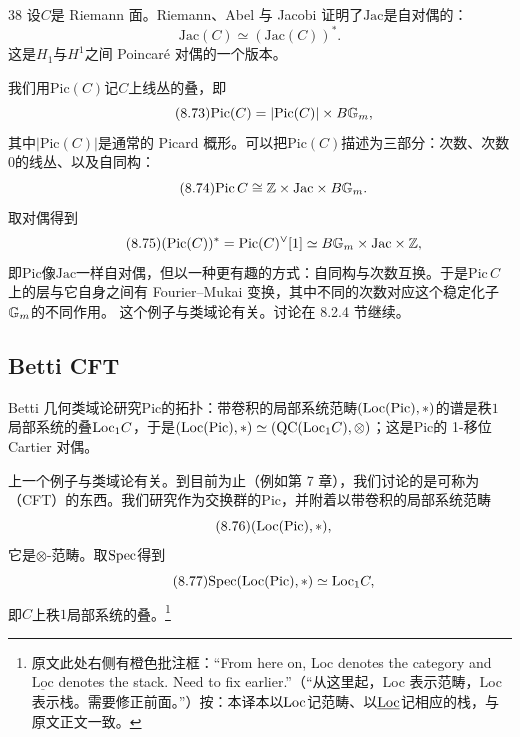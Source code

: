 \begin{srcex}{38}
设$C$是 Riemann 面。Riemann、Abel 与 Jacobi 证明了$\mathrm{Jac}$是自对偶的：
\begin{equation}\tag{8.72}
\mathrm{Jac}(C)\simeq(\mathrm{Jac}(C))^{*}.
\end{equation}
这是$H_1$与$H^1$之间 Poincar\'e 对偶的一个版本。

我们用$\mathrm{Pic}(C)$记$C$上线丛的叠，即
\begin{equation}\tag{8.73}
\mathrm{Pic}(C)=|\mathrm{Pic}(C)|\times B\mathbb{G}_m,
\end{equation}
其中$|\mathrm{Pic}(C)|$是通常的 Picard 概形。可以把$\mathrm{Pic}(C)$描述为三部分：次数、次数$0$的线丛、以及自同构：
\begin{equation}\tag{8.74}
\mathrm{Pic}\,C\cong\mathbb{Z}\times\mathrm{Jac}\times B\mathbb{G}_m.
\end{equation}
取对偶得到
\begin{equation}\tag{8.75}
(\mathrm{Pic}(C))^{*}=\mathrm{Pic}(C)^{\vee}[1]\simeq B\mathbb{G}_m\times\mathrm{Jac}\times\mathbb{Z},
\end{equation}
即$\mathrm{Pic}$像$\mathrm{Jac}$一样自对偶，但以一种更有趣的方式：自同构与次数互换。于是$\mathrm{Pic}\,C$上的层与它自身之间有 Fourier--Mukai 变换，其中不同的次数对应这个稳定化子$\mathbb{G}_m$的不同作用。
这个例子与类域论有关。讨论在 8.2.4 节继续。
\end{srcex}

\subsection{Betti CFT}
\begin{sectionkey}
Betti 几何类域论研究$\mathrm{Pic}$的拓扑：带卷积的局部系统范畴$(\mathrm{Loc}(\mathrm{Pic}),*)$的谱是秩$1$局部系统的叠$\mathrm{Loc}_1 C$，于是$(\mathrm{Loc}(\mathrm{Pic}),*)\simeq(\mathrm{QC}(\mathrm{Loc}_1 C),\otimes)$；这是$\mathrm{Pic}$的 1-移位 Cartier 对偶。
\end{sectionkey}

上一个例子与类域论有关。到目前为止（例如第 7 章），我们讨论的是可称为 （CFT）的东西。我们研究作为交换群的$\mathrm{Pic}$，并附着以带卷积的局部系统范畴
\begin{equation}\tag{8.76}
(\mathrm{Loc}(\mathrm{Pic}),*),
\end{equation}
它是$\otimes$-范畴。取$\mathrm{Spec}$得到
\begin{equation}\tag{8.77}
\mathrm{Spec}(\mathrm{Loc}(\mathrm{Pic}),*)\simeq\mathrm{Loc}_1 C,
\end{equation}
即$C$上秩$1$局部系统的叠。\footnote{原文此处右侧有橙色批注框：“From here on, Loc denotes the category and $\underline{\mathrm{Loc}}$ denotes the stack. Need to fix earlier.”（“从这里起，Loc 表示范畴，Loc 表示栈。需要修正前面。”）按：本译本以$\mathrm{Loc}$记范畴、以$\underline{\mathrm{Loc}}$记相应的栈，与原文正文一致。}

